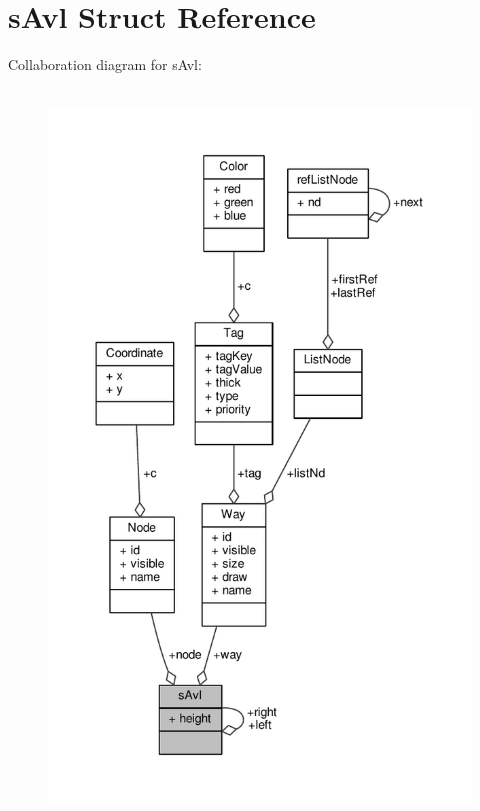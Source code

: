 \hypertarget{structsAvl}{\section{s\-Avl Struct Reference}
\label{structsAvl}
}


Collaboration diagram for s\-Avl\-:
\nopagebreak
\begin{figure}[H]
\begin{center}
\leavevmode
\includegraphics[height=550pt]{structsAvl__coll__graph}
\end{center}
\end{figure}
